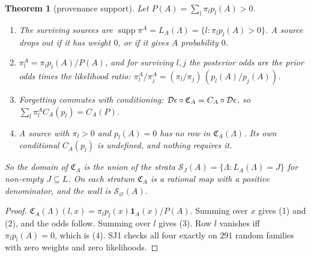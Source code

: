 \documentclass[11pt]{article}
\newtheorem{theorem}{Theorem}\newtheorem{proposition}[theorem]{Proposition}\newtheorem{lemma}[theorem]{Lemma}\newtheorem{corollary}[theorem]{Corollary}\newtheorem{conjecture}[theorem]{Conjecture}
\theoremstyle{definition}\newtheorem{definition}[theorem]{Definition}\newtheorem{remark}[theorem]{Remark}\newtheorem{example}[theorem]{Example}
\begin{document}
\begin{theorem}[provenance support]\label{thm:support}
Let $P(A)=\sum_l\pi_lp_l(A)>0$.
\begin{enumerate}
\item[(1)] The surviving sources are $\operatorname{supp}\pi^A=L_A(\Lambda)=\{l:\pi_lp_l(A)>0\}$. A source drops out if it has weight $0$, or
  if it gives $A$ probability $0$.
\item[(2)] $\pi^A_l=\pi_lp_l(A)/P(A)$, and for surviving $l,j$ the posterior odds are the prior odds times the likelihood ratio:
  $\pi^A_l/\pi^A_j=(\pi_l/\pi_j)\,(p_l(A)/p_j(A))$.
\item[(3)] Forgetting commutes with conditioning: $\mathcal D\epsilon\circ\mathfrak C_A=C_A\circ\mathcal D\epsilon$, so $\sum_l\pi^A_lC_A(p_l)=C_A(P)$.
\item[(4)] A source with $\pi_l>0$ and $p_l(A)=0$ has no row in $\mathfrak C_A(\Lambda)$. Its own conditional $C_A(p_l)$ is undefined, and nothing
  requires it.
\end{enumerate}
So the domain of $\mathfrak C_A$ is the union of the strata $\mathcal S_J(A)=\{\Lambda:L_A(\Lambda)=J\}$ for non-empty $J\subseteq L$. On each stratum
$\mathfrak C_A$ is a rational map with a positive denominator, and the wall is $\mathcal S_\varnothing(A)$.
\end{theorem}

\begin{proof}
$\mathfrak C_A(\Lambda)(l,x)=\pi_lp_l(x)\mathbf 1_A(x)/P(A)$. Summing over $x$ gives (1) and (2), and the odds follow. Summing over $l$ gives (3).
Row $l$ vanishes iff $\pi_lp_l(A)=0$, which is (4). SJ1 checks all four exactly on $291$ random families with zero weights and
zero likelihoods.
\end{proof}
\end{document}
